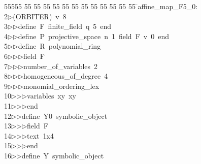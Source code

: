 %
%
\begin{tabbing}
55555 \= 55 \= 55 \= 55 \= 55 \= 55 \= 55 \= 55 \= 55 \= 55 \= 55 \= 55 \= 55 \= \>affine\_map\_F5\_0:\\[0pt]
2\>$\triangleright$\>(ORBITER)\ v\ 8\ \\[0pt]
3\>$\triangleright$\>$\triangleright$\>define\ F\ finite\_field\ q\ 5\ end\ \\[0pt]
4\>$\triangleright$\>$\triangleright$\>define\ P\ projective\_space\ n\ 1\ field\ F\ v\ 0\ end\ \\[0pt]
5\>$\triangleright$\>$\triangleright$\>define\ R\ polynomial\_ring\ \\[0pt]
6\>$\triangleright$\>$\triangleright$\>$\triangleright$\>field\ F\ \\[0pt]
7\>$\triangleright$\>$\triangleright$\>$\triangleright$\>number\_of\_variables\ 2\ \\[0pt]
8\>$\triangleright$\>$\triangleright$\>$\triangleright$\>homogeneous\_of\_degree\ 4\ \\[0pt]
9\>$\triangleright$\>$\triangleright$\>$\triangleright$\>monomial\_ordering\_lex\ \\[0pt]
10\>$\triangleright$\>$\triangleright$\>$\triangleright$\>variables\ xy\ xy\ \\[0pt]
11\>$\triangleright$\>$\triangleright$\>$\triangleright$\>end\ \\[0pt]
12\>$\triangleright$\>$\triangleright$\>define\ Y0\ symbolic\_object\ \\[0pt]
13\>$\triangleright$\>$\triangleright$\>$\triangleright$\>field\ F\ \\[0pt]
14\>$\triangleright$\>$\triangleright$\>$\triangleright$\>text\ 1x4\ \\[0pt]
15\>$\triangleright$\>$\triangleright$\>$\triangleright$\>end\ \\[0pt]
16\>$\triangleright$\>$\triangleright$\>define\ Y\ symbolic\_object\ \\[0pt]

\end{tabbing}
